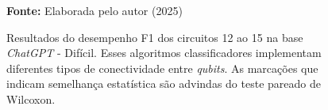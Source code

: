 \begin{figure}
\caption{Resultados do desempenho F1 dos circuitos 12 ao 15 na base \textit{ChatGPT} - Difícil. Esses algoritmos classificadores implementam diferentes tipos de conectividade entre \textit{qubits}. As marcações que indicam semelhança estatística são advindas do teste pareado de Wilcoxon.}
\label{fig:f1:hard:g3}
     \centering
    \centering

      \par\medskip\ABNTEXfontereduzida\selectfont\textbf{Fonte:} Elaborada pelo autor (2025) \par\medskip
\end{figure}